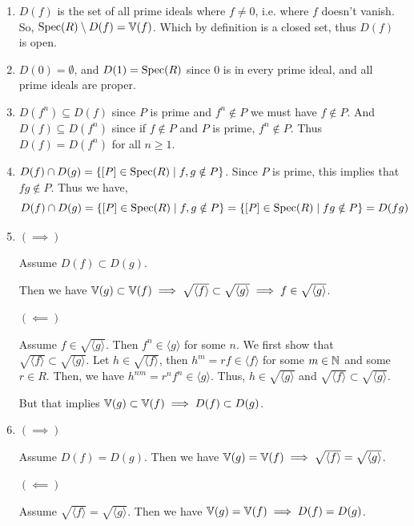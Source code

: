 \documentclass[Notebook.tex]{subfiles}
\begin{document}
\begin{solution}
    \bbni
    \begin{enumerate}
        \item $D(f)$ is the set of all prime ideals where $f \neq 0$, i.e. where $f$ doesn't vanish. So, $\operatorname{Spec}(R)\setminus D(f) = \mathbb V(f)$. Which by definition is a closed set, thus $D(f)$ is open. 
        \item $D(0) = \emptyset$, and $D(1) = \operatorname{Spec}(R)$ since $0$ is in every prime ideal, and all prime ideals are proper. 
        \item $D(f^n) \subseteq D(f)$ since $P$ is prime and $f^n \notin P$ we must have $f \notin P$. 
        And $D(f) \subseteq D(f^n)$ since if $f \notin P$ and $P$ is prime, $f^n \notin P$.  Thus $D(f) = D(f^{n})$ for all $n\geq1$. 

        \item $D(f) \cap D(g) = \{[P] \in \operatorname{Spec}(R) \mid f, g \notin P\}$. Since $P$ is prime, this implies that $fg \notin P$. Thus we have,  
        \[D(f) \cap D(g) = \{[P] \in \operatorname{Spec}(R) \mid f, g \notin P\} = \{[P] \in \operatorname{Spec}(R) \mid fg \notin P\} = D(fg)\]
        \item $(\implies)$ 
        
        Assume $D(f) \subset D(g)$. 
        
        Then we have $\mathbb V(g) \subset \mathbb V(f) \implies \sqrt{\langle f \rangle} \subset  \sqrt{\langle g \rangle} \implies f \in  \sqrt{\langle g \rangle}$. 

        $(\impliedby)$

        Assume $f \in \sqrt{\langle g \rangle}$. Then $f^n \in \langle g \rangle$ for some $n$. We first show that $\sqrt{\langle f \rangle} \subset \sqrt{\langle g \rangle}$. Let $h \in \sqrt{\langle f \rangle}$, then $h^m =rf \in \langle f \rangle$ for some $m \in \mathbb N$ and some $r \in R$. Then, we have  $h^{nm} = r^n f^n \in \langle g \rangle$. Thus, $h \in \sqrt{\langle g \rangle}$ and $\sqrt{\langle f \rangle} \subset \sqrt{\langle g \rangle}$. 

        But that implies $\mathbb V(g) \subset \mathbb V(f) \implies D(f) \subset D(g)$. 

        \item $(\implies)$ 
        
        Assume $D(f) = D(g)$. Then we have $\mathbb V(g) = \mathbb V(f) \implies \sqrt{\langle f \rangle} =  \sqrt{\langle g \rangle}$. 

        $(\impliedby)$

        Assume $\sqrt{\langle f \rangle} = \sqrt{\langle g \rangle}$. Then we have $\mathbb V(g) = \mathbb V(f) \implies D(f) = D(g)$. 


\end{enumerate}
\end{solution}
\end{document}
